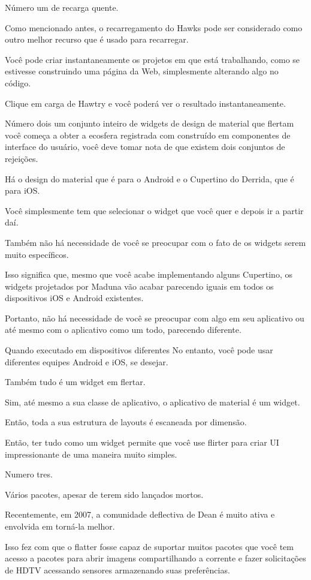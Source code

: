 Número um de recarga quente.

Como mencionado antes, o recarregamento do Hawks pode ser considerado como outro melhor recurso que é usado para recarregar.

Você pode criar instantaneamente os projetos em que está trabalhando, como se estivesse construindo uma página da Web, simplesmente alterando algo no código.

Clique em carga de Hawtry e você poderá ver o resultado instantaneamente.

Número dois um conjunto inteiro de widgets de design de material que flertam você começa a obter a ecosfera registrada com construído em componentes de interface do usuário, você deve tomar nota de que existem dois conjuntos de rejeições.

Há o design do material que é para o Android e o Cupertino do Derrida, que é para iOS.

Você simplesmente tem que selecionar o widget que você quer e depois ir a partir daí.

Também não há necessidade de você se preocupar com o fato de os widgets serem muito específicos.

Isso significa que, mesmo que você acabe implementando alguns Cupertino, os widgets projetados por Maduna vão acabar parecendo iguais em todos os dispositivos iOS e Android existentes.

Portanto, não há necessidade de você se preocupar com algo em seu aplicativo ou até mesmo com o aplicativo como um todo, parecendo diferente.

Quando executado em dispositivos diferentes No entanto, você pode usar diferentes equipes Android e iOS, se desejar.

Também tudo é um widget em flertar.

Sim, até mesmo a sua classe de aplicativo, o aplicativo de material é um widget.

Então, toda a sua estrutura de layouts é escaneada por dimensão.

Então, ter tudo como um widget permite que você use flirter para criar UI impressionante de uma maneira muito simples.

Numero tres.

Vários pacotes, apesar de terem sido lançados mortos.

Recentemente, em 2007, a comunidade deflectiva de Dean é muito ativa e envolvida em torná-la melhor.

Isso fez com que o flatter fosse capaz de suportar muitos pacotes que você tem acesso a pacotes para abrir imagens compartilhando a corrente e fazer solicitações de HDTV acessando sensores armazenando suas preferências.

